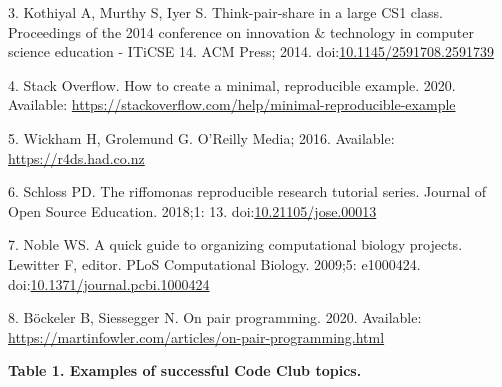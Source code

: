 \documentclass[
  11pt,
]{article}
\begin{document}
\leavevmode\hypertarget{ref-Kothiyal2014}{}%
3. Kothiyal A, Murthy S, Iyer S. Think-pair-share in a large CS1 class.
Proceedings of the 2014 conference on innovation \& technology in
computer science education - ITiCSE 14. ACM Press; 2014.
doi:\href{https://doi.org/10.1145/2591708.2591739}{10.1145/2591708.2591739}

\leavevmode\hypertarget{ref-StackOverflow_MREE}{}%
4. Stack Overflow. How to create a minimal, reproducible example. 2020.
Available:
\url{https://stackoverflow.com/help/minimal-reproducible-example}

\leavevmode\hypertarget{ref-Wickham_2016}{}%
5. Wickham H, Grolemund G. O'Reilly Media; 2016. Available:
\url{https://r4ds.had.co.nz}

\leavevmode\hypertarget{ref-Schloss_2018}{}%
6. Schloss PD. The riffomonas reproducible research tutorial series.
Journal of Open Source Education. 2018;1: 13.
doi:\href{https://doi.org/10.21105/jose.00013}{10.21105/jose.00013}

\leavevmode\hypertarget{ref-Noble2009}{}%
7. Noble WS. A quick guide to organizing computational biology projects.
Lewitter F, editor. PLoS Computational Biology. 2009;5: e1000424.
doi:\href{https://doi.org/10.1371/journal.pcbi.1000424}{10.1371/journal.pcbi.1000424}

\leavevmode\hypertarget{ref-Bockeler_2020}{}%
8. Böckeler B, Siessegger N. On pair programming. 2020. Available:
\url{https://martinfowler.com/articles/on-pair-programming.html}

\newpage

\textbf{Table 1. Examples of successful Code Club topics.}
\end{document}
